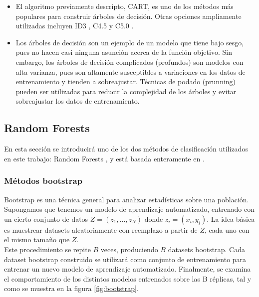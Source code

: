 \begin{itemize}
\item El algoritmo previamente descripto, CART, es uno de los métodos más populares para construir árboles de decisión. Otras opciones ampliamente utilizadas incluyen ID3 \cite{id3}, C4.5 \cite{c45} y C5.0 \cite{noauthororeditor2013applied}.
\item Los árboles de decisión son un ejemplo de un modelo que tiene bajo sesgo, pues no hacen casi ninguna asunción acerca de la función objetivo. Sin embargo, los árboles de decisión complicados (profundos) son modelos con alta varianza, pues son altamente susceptibles a variaciones en los datos de entrenamiento y tienden a sobreajustar. Técnicas de podado (prunning) pueden ser utilizadas para reducir la complejidad de los árboles y evitar sobreajustar los datos de entrenamiento.
\end{itemize}


\subsection{Random Forests}

En esta sección se introducirá uno de los dos métodos de clasificación utilizados en este trabajo: Random Forests \cite{rf}, y está basada enteramente en \cite{statisticallearning}.

\subsubsection{Métodos bootstrap}

Bootstrap es una técnica general para analizar estadísticas sobre una población. Supongamos que tenemos un modelo de aprendizaje automatizado, entrenado con un cierto conjunto de datos $Z=(z_1, \ldots, z_N)$ donde $z_i=(x_i,y_i)$. La idea básica es muestrear datasets aleatoriamente con reemplazo a partir de $Z$, cada uno con el mismo tamaño que $Z$. \\

Este procedimiento se repite $B$ veces, produciendo $B$ datasets bootstrap. Cada dataset bootstrap construido se utilizará como conjunto de entrenamiento para entrenar un nuevo modelo de aprendizaje automatizado. Finalmente, se examina el comportamiento de los distintos modelos entrenados sobre las B réplicas, tal y como se muestra en la figura \ref{fig:bootstrap}. \\


